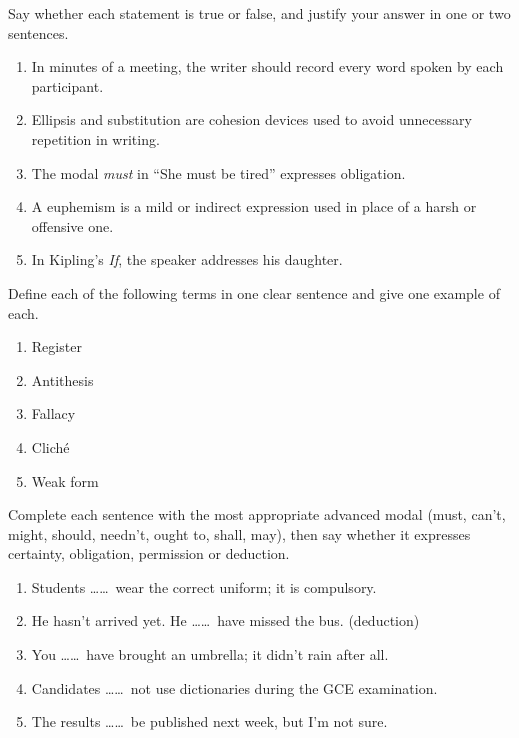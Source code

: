 \documentclass[11pt]{article}
\begin{document}
\begin{exercice}
Say whether each statement is true or false, and justify your answer in one or two sentences.
\begin{enumerate}
\item In minutes of a meeting, the writer should record every word spoken by each participant.
\item Ellipsis and substitution are cohesion devices used to avoid unnecessary repetition in writing.
\item The modal \emph{must} in ``She must be tired'' expresses obligation.
\item A euphemism is a mild or indirect expression used in place of a harsh or offensive one.
\item In Kipling's \emph{If}, the speaker addresses his daughter.
\end{enumerate}
\end{exercice}

\begin{exercice}
Define each of the following terms in one clear sentence and give one example of each.
\begin{enumerate}
\item Register
\item Antithesis
\item Fallacy
\item Clich\'e
\item Weak form
\end{enumerate}
\end{exercice}

\begin{exercice}
Complete each sentence with the most appropriate advanced modal (must, can't, might, should, needn't, ought to, shall, may), then say whether it expresses certainty, obligation, permission or deduction.
\begin{enumerate}
\item Students \ldots\ldots\ wear the correct uniform; it is compulsory.
\item He hasn't arrived yet. He \ldots\ldots\ have missed the bus. (deduction)
\item You \ldots\ldots\ have brought an umbrella; it didn't rain after all.
\item Candidates \ldots\ldots\ not use dictionaries during the GCE examination.
\item The results \ldots\ldots\ be published next week, but I'm not sure.
\end{enumerate}
\end{exercice}
\end{document}
